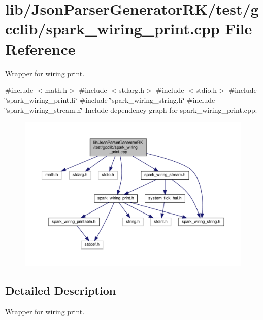 \section{lib/\+Json\+Parser\+Generator\+R\+K/test/gcclib/spark\+\_\+wiring\+\_\+print.cpp File Reference}
\label{spark__wiring__print_8cpp}


Wrapper for wiring print.  


{\ttfamily \#include $<$math.\+h$>$}\newline
{\ttfamily \#include $<$stdarg.\+h$>$}\newline
{\ttfamily \#include $<$stdio.\+h$>$}\newline
{\ttfamily \#include \char`\"{}spark\+\_\+wiring\+\_\+print.\+h\char`\"{}}\newline
{\ttfamily \#include \char`\"{}spark\+\_\+wiring\+\_\+string.\+h\char`\"{}}\newline
{\ttfamily \#include \char`\"{}spark\+\_\+wiring\+\_\+stream.\+h\char`\"{}}\newline
Include dependency graph for spark\+\_\+wiring\+\_\+print.\+cpp\+:\nopagebreak
\begin{figure}[H]
\begin{center}
\leavevmode
\includegraphics[width=350pt]{spark__wiring__print_8cpp__incl}
\end{center}
\end{figure}


\subsection{Detailed Description}
Wrapper for wiring print. 

